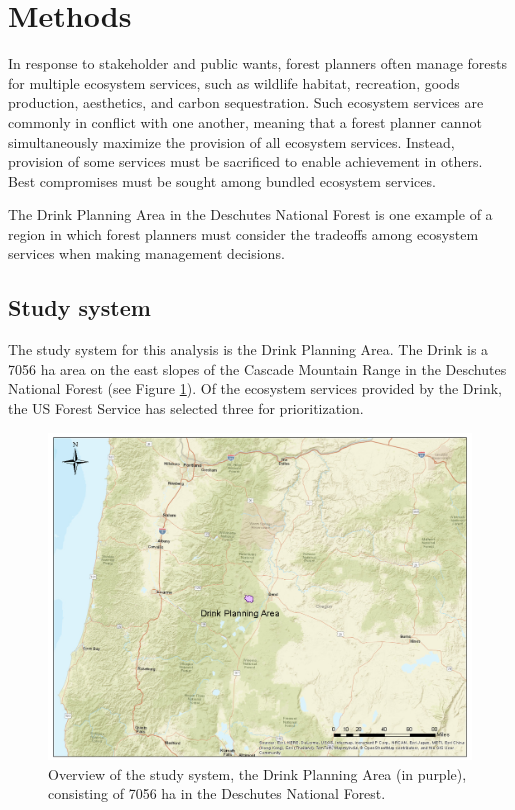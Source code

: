 \section{Methods}
In response to stakeholder and public wants, forest planners often manage forests for multiple ecosystem services, such as wildlife habitat, recreation, goods production, aesthetics, and carbon sequestration. Such ecosystem services are commonly in conflict with one another, meaning that a forest planner cannot simultaneously maximize the provision of all ecosystem services. Instead, provision of some services must be sacrificed to enable achievement in others. Best compromises must be sought among bundled ecosystem services.

The Drink Planning Area in the Deschutes National Forest is one example of a region in which forest planners must consider the tradeoffs among ecosystem services when making management decisions.

\subsection{Study system}
\label{subsec:studyArea}
The study system for this analysis is the Drink Planning Area. The Drink is a 7056 ha area on the east slopes of the Cascade Mountain Range in the Deschutes National Forest (see Figure \ref{fig:drinkOverview}). Of the ecosystem services provided by the Drink, the US Forest Service has selected three for prioritization.

\begin{figure}[ht]
\centering
\includegraphics[width=.85\textwidth]{../images/DrinkMap_Overview}
\caption[Overview of the study system, the Drink Planning Area]{Overview of the study system, the Drink Planning Area (in purple), consisting of 7056 ha in the Deschutes National Forest.}
\label{fig:drinkOverview}
\end{figure}

